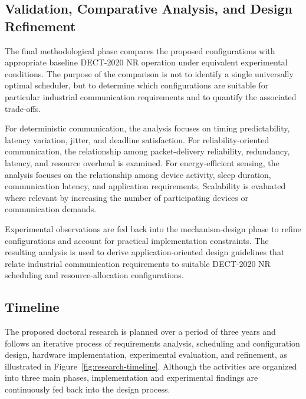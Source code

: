 \documentclass[12pt,a4paper]{article}
\begin{document}

\subsection{Validation, Comparative Analysis, and Design Refinement}
\label{subsec:validation}

The final methodological phase compares the proposed configurations with
appropriate baseline DECT-2020 NR operation under equivalent experimental
conditions. The purpose of the comparison is not to identify a single
universally optimal scheduler, but to determine which configurations are
suitable for particular industrial communication requirements and to quantify
the associated trade-offs.

For deterministic communication, the analysis focuses on timing
predictability, latency variation, jitter, and deadline satisfaction. For
reliability-oriented communication, the relationship among packet-delivery
reliability, redundancy, latency, and resource overhead is examined. For
energy-efficient sensing, the analysis focuses on the relationship among
device activity, sleep duration, communication latency, and application
requirements. Scalability is evaluated where relevant by increasing the
number of participating devices or communication demands.

Experimental observations are fed back into the mechanism-design phase to
refine configurations and account for practical implementation constraints.
The resulting analysis is used to derive application-oriented design
guidelines that relate industrial communication requirements to suitable
DECT-2020 NR scheduling and resource-allocation configurations.


\subsection{Timeline}
\label{subsec:timeline}

The proposed doctoral research is planned over a period of three years and
follows an iterative process of requirements analysis, scheduling and
configuration design, hardware implementation, experimental evaluation, and
refinement, as illustrated in Figure~\ref{fig:research-timeline}. Although the
activities are organized into three main phases, implementation and experimental
findings are continuously fed back into the design process.
\end{document}
